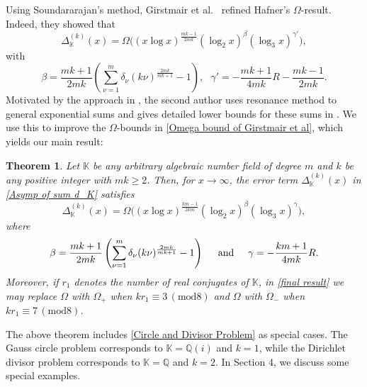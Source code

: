 \documentclass[reqno]{amsart}
\numberwithin{equation}{section}
\theoremstyle{plain}
\newtheorem{theorem}{Theorem}[section]
\begin{document}
Using Soundararajan's \cite{Sound} method, Girstmair et al.\ \cite{GKMN} refined Hafner's \cite{Halfner(2)} $\Omega$-result.
 Indeed, they showed that 
\begin{equation}\label{Omega bound of Girstmair et al}
	\Delta_{\mathbb{K}}^{(k)}(x) = \Omega\Big( (x\log x)^{\frac{mk-1}{2mk}} (\log_2x)^{\beta} (\log_3 x)^{\gamma'} \Big),
\end{equation}
	with
\begin{equation}\label{beta and gamma}
	\beta = \frac{mk+1}{2mk} \left( \sum_{\nu =1}^{m}\delta_{\nu} (k\nu )^{\frac{2mk}{mk+1}}-1\right), \ \  \ \gamma'= - \frac{mk+1}{4mk}{R} - \frac{mk-1}{2mk}.
\end{equation}
Motivated by the approach in \cite{AMM}, the second author uses resonance method to general exponential sums and gives detailed lower bounds for these sums in \cite[Theorem 5]{K. Mahatab}. We use this to improve the $\Omega$-bounds in \eqref{Omega bound of Girstmair et al}, which yields our main result:

	\begin{theorem} \label{Main Result}
	Let $\mathbb{K}$ be any arbitrary algebraic number field of degree $m$ and $k$ be any positive integer with $mk\geq 2$. Then, for $x \rightarrow \infty$, the error term $\Delta_{\mathbb{K}}^{(k)}(x)$ in \eqref{Asymp of sum d_K} satisfies 
	\begin{equation} \label{final result}
		\Delta_{\mathbb{K}}^{(k)}(x) = \Omega\Big( (x\log x)^{\frac{km-1}{2km}} (\log_2 x)^{\beta} (\log_3 x)^{\gamma} \Big),
	\end{equation} 
	where 
	\begin{equation*}
	\beta = \frac{mk+1}{2mk} \left( \sum_{\nu =1}^{m}\delta_{\nu} (k\nu )^{\frac{2mk}{mk+1}}-1\right) \hspace{0.5cm}\text{and} \hspace{0.5cm}\gamma= - \frac{km+1}{4mk}{R}.
	\end{equation*}
 Moreover, if $r_1$ denotes the number of real conjugates of  $\mathbb{K}$,
 in \eqref{final result} we may replace $\Omega$ with $\Omega_{+}$  when $kr_1 \equiv 3 \,(\mathrm{mod} 8)$ and $\Omega$ with $\Omega_{-}$ when $kr_1 \equiv 7 \,(\mathrm{mod} 8)$.
	\end{theorem}

	The above theorem includes \eqref{Circle and Divisor Problem} as special cases. The Gauss circle problem corresponds to $\mathbb{K}=\mathbb{Q}(i)$ and $k=1$, while the Dirichlet divisor problem corresponds to $\mathbb{K}=\mathbb{Q}$ and $k=2$. In Section 4, we discuss some special examples.
	
\end{document}
